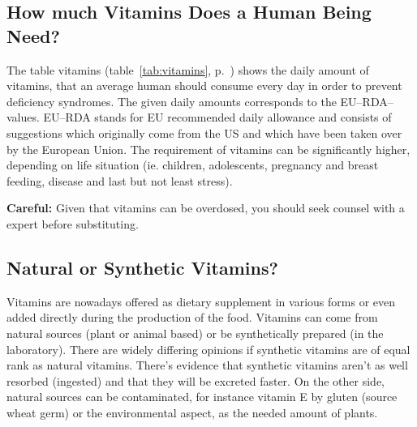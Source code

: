 \documentclass[../main.tex]{subfiles}
\begin{document}
    \subsection{How much Vitamins Does a Human Being Need?}

    The table vitamins (table~\ref{tab:vitamins}, p.~\pageref{tab:vitamins}) shows the daily amount of vitamins,
    that an average human should consume every day in order to prevent deficiency syndromes.
    The given daily amounts corresponds to the EU--RDA--values.
    EU--RDA stands for EU recommended daily allowance and consists of suggestions which originally come from the US and which
    have been taken over by the European Union.
    The requirement of vitamins can be significantly higher, depending on life situation
    (ie. children, adolescents, pregnancy and breast feeding, disease and last but not least stress).

    \textbf{Careful:} Given that vitamins can be overdosed, you should seek counsel with a expert before substituting.

    \subsection{Natural or Synthetic Vitamins?}
    Vitamins are nowadays offered as dietary supplement in various forms or even added directly during the production of the food.
    Vitamins can come from natural sources (plant or animal based) or be synthetically prepared (in the laboratory).
    There are widely differing opinions if synthetic vitamins are of equal rank as natural vitamins.
    There's evidence that synthetic vitamins aren't as well resorbed (ingested) and that they will be excreted faster.
    On the other side, natural sources can be contaminated, for instance vitamin E by gluten (source wheat germ)
    or the environmental aspect, as the needed amount of plants.
\end{document}
